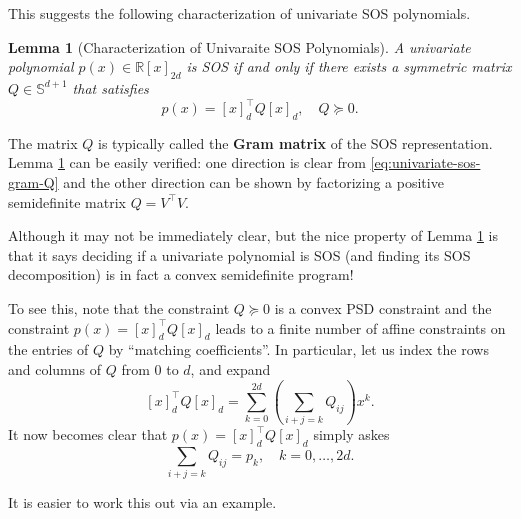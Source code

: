 \documentclass[
]{book}
\newtheorem{lemma}{Lemma}[chapter]
\theoremstyle{definition}
\theoremstyle{definition}
\theoremstyle{definition}
\theoremstyle{definition}
\theoremstyle{remark}
\begin{document}
This suggests the following characterization of univariate SOS polynomials.

\begin{lemma}[Characterization of Univaraite SOS Polynomials]
\protect\hypertarget{lem:UnivaraiteSOS}{}\label{lem:UnivaraiteSOS}A univariate polynomial \(p(x) \in \mathbb{R}[x]_{2d}\) is SOS if and only if there exists a symmetric matrix \(Q \in \mathbb{S}^{d+1}\) that satisfies
\[
p(x) = [x]_d^\top Q [x]_d, \quad Q \succeq 0.
\]
\end{lemma}

The matrix \(Q\) is typically called the \textbf{Gram matrix} of the SOS representation. Lemma \ref{lem:UnivaraiteSOS} can be easily verified: one direction is clear from \eqref{eq:univariate-sos-gram-Q} and the other direction can be shown by factorizing a positive semidefinite matrix \(Q = V^\top V\).

Although it may not be immediately clear, but the nice property of Lemma \ref{lem:UnivaraiteSOS} is that it says deciding if a univariate polynomial is SOS (and finding its SOS decomposition) is in fact a convex semidefinite program!

To see this, note that the constraint \(Q \succeq 0\) is a convex PSD constraint and the constraint \(p(x) = [x]_d^\top Q [x]_d\) leads to a finite number of affine constraints on the entries of \(Q\) by ``matching coefficients''. In particular, let us index the rows and columns of \(Q\) from \(0\) to \(d\), and expand
\[
[x]_d^\top Q [x]_d = \sum_{k=0}^{2d} \left( \sum_{i+j=k} Q_{ij} \right) x^k.
\]
It now becomes clear that \(p(x) = [x]_d^\top Q [x]_d\) simply askes
\[
\sum_{i+j=k} Q_{ij} = p_k, \quad k = 0, \dots, 2d.
\]

It is easier to work this out via an example.
\end{document}
